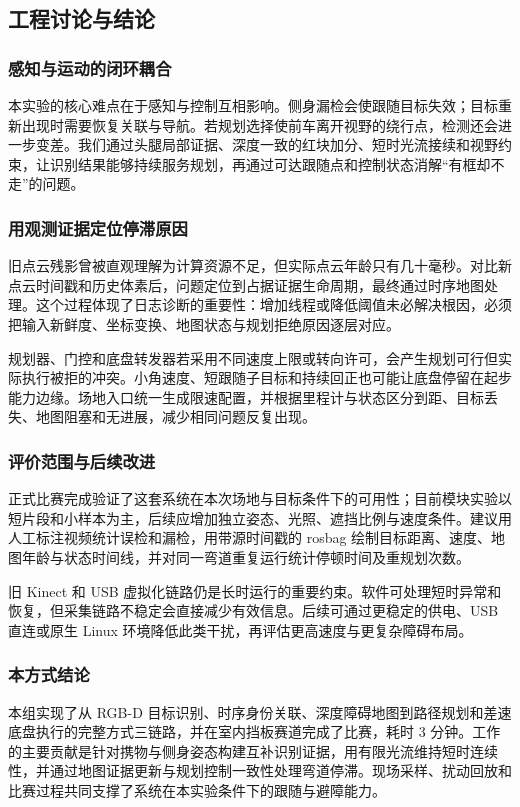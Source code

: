 \FloatBarrier
{}
\subsection{工程讨论与结论}\label{sec:f3-discussion}
\subsubsection{感知与运动的闭环耦合}
本实验的核心难点在于感知与控制互相影响。侧身漏检会使跟随目标失效；目标重新出现时需要恢复关联与导航。若规划选择使前车离开视野的绕行点，检测还会进一步变差。我们通过头腿局部证据、深度一致的红块加分、短时光流接续和视野约束，让识别结果能够持续服务规划，再通过可达跟随点和控制状态消解“有框却不走”的问题。
\subsubsection{用观测证据定位停滞原因}
旧点云残影曾被直观理解为计算资源不足，但实际点云年龄只有几十毫秒。对比新点云时间戳和历史体素后，问题定位到占据证据生命周期，最终通过时序地图处理。这个过程体现了日志诊断的重要性：增加线程或降低阈值未必解决根因，必须把输入新鲜度、坐标变换、地图状态与规划拒绝原因逐层对应。

规划器、门控和底盘转发器若采用不同速度上限或转向许可，会产生规划可行但实际执行被拒的冲突。小角速度、短跟随子目标和持续回正也可能让底盘停留在起步能力边缘。场地入口统一生成限速配置，并根据里程计与状态区分到距、目标丢失、地图阻塞和无进展，减少相同问题反复出现。
\subsubsection{评价范围与后续改进}
正式比赛完成验证了这套系统在本次场地与目标条件下的可用性；目前模块实验以短片段和小样本为主，后续应增加独立姿态、光照、遮挡比例与速度条件。建议用人工标注视频统计误检和漏检，用带源时间戳的 rosbag 绘制目标距离、速度、地图年龄与状态时间线，并对同一弯道重复运行统计停顿时间及重规划次数。

旧 Kinect 和 USB 虚拟化链路仍是长时运行的重要约束。软件可处理短时异常和恢复，但采集链路不稳定会直接减少有效信息。后续可通过更稳定的供电、USB 直连或原生 Linux 环境降低此类干扰，再评估更高速度与更复杂障碍布局。
\subsubsection{本方式结论}
本组实现了从 RGB-D 目标识别、时序身份关联、深度障碍地图到路径规划和差速底盘执行的完整方式三链路，并在室内挡板赛道完成了比赛，耗时 3 分钟。工作的主要贡献是针对携物与侧身姿态构建互补识别证据，用有限光流维持短时连续性，并通过地图证据更新与规划控制一致性处理弯道停滞。现场采样、扰动回放和比赛过程共同支撑了系统在本实验条件下的跟随与避障能力。



